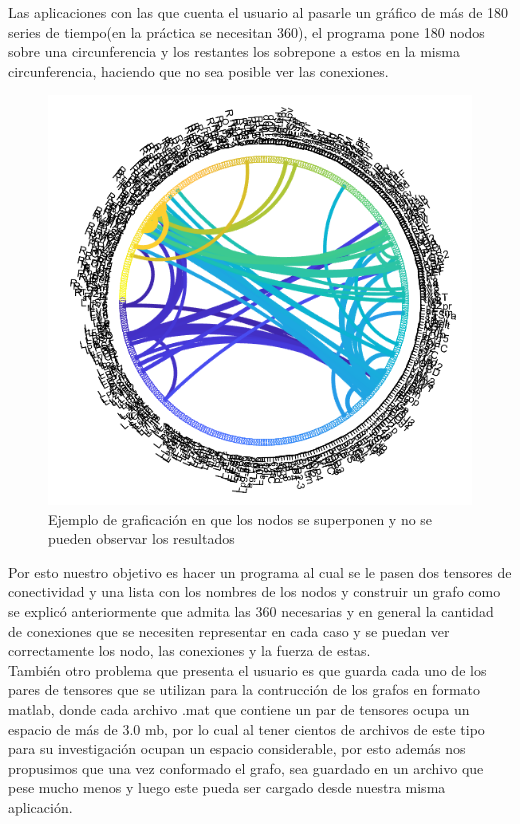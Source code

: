 \documentclass[a4paper,10pt,twocolumn]{article}
\begin{document}
\newpage


Las aplicaciones con las que cuenta el usuario al pasarle un gráfico de más de 180 series de tiempo(en la práctica se necesitan 360), el programa pone 180 nodos sobre una circunferencia y los restantes los sobrepone a estos en la misma circunferencia, haciendo que no sea posible ver las conexiones.\\


\begin{figure}[h!]%
\center
\includegraphics[scale=0.3]{example2.png}
\caption{Ejemplo de graficación en que los nodos se superponen y no se pueden observar los resultados}
\end{figure}
 
 
Por esto nuestro objetivo es hacer un programa al cual se le pasen dos tensores de conectividad y una lista con los nombres de los nodos y construir un grafo como se explicó anteriormente que admita las 360 necesarias y en general la cantidad de conexiones que se necesiten representar en cada caso y se puedan ver correctamente los nodo, las conexiones y la fuerza de estas. \\

También otro problema que presenta el usuario es que guarda cada uno de los pares de tensores que se utilizan para la contrucción de los grafos en formato matlab, donde cada archivo .mat que contiene un par de tensores ocupa un espacio de más de 3.0 mb, por lo cual al tener cientos de archivos de este tipo para su investigación ocupan un espacio considerable, por esto además nos propusimos que una vez conformado el grafo, sea guardado en un archivo que pese mucho menos y luego este pueda ser cargado desde nuestra misma aplicación. 
\end{document}
